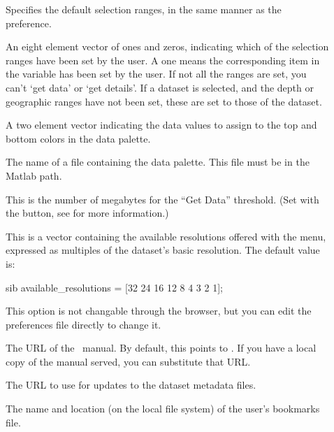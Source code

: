 \begin{description}
\item[] Specifies the default selection ranges, in the
  same manner as the  preference.
\item[] An eight element vector of ones and zeros,
  indicating which of the selection ranges have been set by the user.
  A one means the corresponding item in the  variable has
  been set by the user.  If not all the ranges are set, you can't `get
  data' or `get details'.  If a dataset is selected, and the depth or
  geographic ranges have not been set, these are set to those of the
  dataset.
\item[] A two element vector indicating the data
  values to assign to the top and bottom colors in the data palette.
\item[] The name of a file containing the data
  palette.  This file must be in the Matlab path.
\item[] This is the number of megabytes for the
  ``Get Data'' threshold. (Set with the  button, see  for more
  information.)
\item[] This is a vector containing the
  available resolutions offered with the  menu,
  expressed as multiples of the dataset's basic resolution.  The
  default value is:

\begin{vcode}{sib}
available_resolutions = [32 24 16 12 8 4 3 2 1];
\end{vcode}
  
  This option is not changable through the browser, but you can edit
  the preferences file directly to change it.
\item[] The URL of the \GUI\ manual.  By default, this
  points to \xlink{\lit{\footnotesize\DODSmguiUrl}}{\DODSmguiUrl}.  If
  you have a local copy of the manual served, you can substitute that
  URL.

\item[] The URL to use for updates to the dataset
  metadata files.

\item[] The name and location (on the local file
  system) of the user's bookmarks file.

\end{description}


%
%
%
%
%
%
%
%
